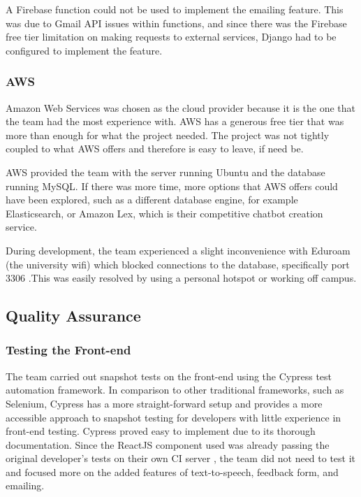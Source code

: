 \documentclass{l3proj}
\begin{document}
A Firebase function could not be used to implement the emailing feature. This was due to Gmail API issues within functions, and since there was the Firebase free tier limitation on making requests to external services, Django had to be configured to implement the feature.


\subsubsection{AWS}
\label{subsubsec:aws}
Amazon Web Services was chosen as the cloud provider because it is the one that the team had the most experience with. AWS has a generous free tier that was more than enough for what the project needed. The project was not tightly coupled to what AWS offers and therefore is easy to leave, if need be.

AWS provided the team with the server running Ubuntu and the database running MySQL. If there was more time, more options that AWS offers could have been explored, such as a different database engine, for example Elasticsearch, or Amazon Lex, which is their competitive chatbot creation service.

During development, the team experienced a slight inconvenience with Eduroam (the university wifi) which blocked connections to the database, specifically port 3306 \cite{SUPERUSER}.This was easily resolved by using a personal hotspot or working off campus.


\subsection{Quality Assurance}
\label{subsec:qa}

\subsubsection{Testing the Front-end}
\label{subsubsec:testfront}
The team carried out snapshot tests on the front-end using the Cypress \cite{CYPRESS} test automation framework. In comparison to other traditional frameworks, such as Selenium, Cypress has a more straight-forward setup and provides a more accessible approach to snapshot testing for developers with little experience in front-end testing. Cypress proved easy to implement due to its thorough documentation. Since the ReactJS component used was already passing the original developer's tests on their own CI server \cite{CHATBOTCI}, the team did not need to test it and focused more on the added features of text-to-speech, feedback form, and emailing.
\end{document}
